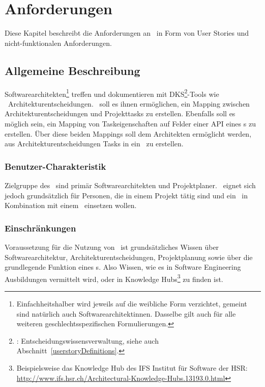 \chapter{Anforderungen}

Diese Kapitel beschreibt die Anforderungen an \eeppi\ in Form von User Stories und nicht-funktionalen Anforderungen.

\section{Allgemeine Beschreibung}

Softwarearchitekten\footnote{Einfachheitshalber wird jeweils auf die weibliche Form verzichtet, gemeint sind natürlich auch Softwarearchitektinnen. Dasselbe gilt auch für alle weiteren geschlechtsspezifischen Formulierungen.} treffen und dokumentieren mit DKS\footnote{\dks: Entscheidungswissensverwaltung, siehe auch Abschnitt~\ref{userstoryDefinitions}.}-Tools wie \cdar\ Architekturentscheidungen.
\eeppi\ soll es ihnen ermöglichen, ein Mapping zwischen Architekturentscheidungen und Projekttasks zu erstellen.
Ebenfalls soll es möglich sein, ein Mapping von Taskeigenschaften auf Felder einer API eines \ppt s zu erstellen.
Über diese beiden Mappings soll dem Architekten ermöglicht werden, aus Architekturentscheidungen Tasks in ein \ppt\ zu erstellen.

\subsection{Benutzer-Charakteristik}
Zielgruppe des \eeppi\ sind primär Softwarearchitekten und Projektplaner. \eeppi\ eignet sich jedoch grundsätzlich für Personen, die in einem Projekt tätig sind und ein \dks\ in Kombination mit einem \ppt\ einsetzen wollen.

\subsection{Einschränkungen}
Voraussetzung für die Nutzung von \eeppi\ ist grundsätzliches Wissen über Softwarearchitektur, Architekturentscheidungen, Projektplanung sowie über die grundlegende Funktion eines \ppt s.
Also Wissen, wie es in Software Engineering Ausbildungen vermittelt wird,
oder in Knowledge Hubs\footnote{Beispielsweise das Knowledge Hub des IFS Institut für Software der HSR: \url{http://www.ifs.hsr.ch/Architectural-Knowledge-Hubs.13193.0.html}} zu finden ist.